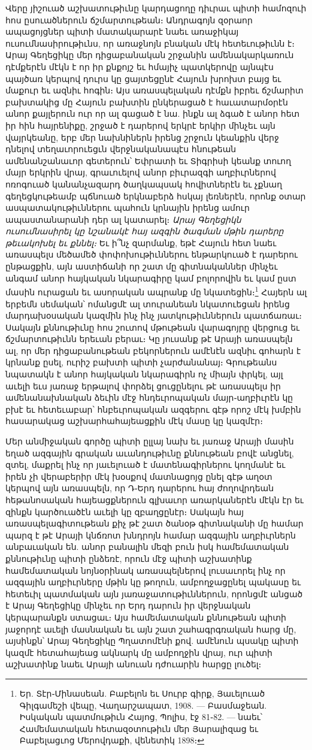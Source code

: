 \documentclass{article}
\begin{document}
{Վերը յիշուած աշխատութիւնը կարդացողը դիւրաւ պիտի համոզուի հոս ըսուածներուն ճշմարտութեան։ Անդրագոյն զօրաոր ապացոյցներ պիտի մատակարարէ նաեւ առաջիկայ ուսումնասիրութիւնս, որ առաջնոյն բնական մէկ հետեւութիւնն է։ Արայ Գեղեցիկը մեր դիցաբանական շրջանին ամենակարկառուն դէմքերէն մէկն է որ իր քնքոյշ եւ հմայիչ պատկերովը այնպէս պայծառ կերպով դուրս կը ցայտեցընէ Հայուն խրոխտ բայց եւ մաքուր եւ ազնիւ հոգին։ Այս առասպելական դէմքն իբրեւ ճշմարիտ բախտակից մը Հայուն բախտին ընկերացած է հաւատարմօրէն անոր քայլերուն ուր որ ալ գացած է նա. ինքն ալ ձգած է անոր հետ իր հին հայրենիքը, շրջած է դարերով երկրէ երկիր մինչեւ այն վայրկեանը, երբ մեր նախնիներն իրենց շրջուն կեանքին վերջ դնելով տեղաւորուեցւն վերջնականապէս հնութեան ամենանշանաւոր գետերուն՝ Եփրատի եւ Տիգրիսի կեանք տուող մայր երկրին վրայ, գրաւուելով անոր բիւրազգի աղբիւրներով ոռոգուած կանանչազարդ ծաղկապսակ հովիտներէն եւ չքնաղ գեղեցկութեամբ պճնուած երկնաբերձ հսկայ լեռներէն, որոնք օտար ասպատակութիւններու պահուն կրնային իրենց ամուր ապաստանարանի դեր ալ կատարել։ \emph{Արայ Գեղեցիկն ուսումնասիրել կը նշանակէ հայ ազգին ծագման մթին դարերը թեւակոխել եւ քննել։} Եւ ի՞նչ զարմանք, եթէ Հայուն հետ նաեւ առասպելս մեծամեծ փոփոխութիւններու ենթարկուած է դարերու ընթացքին, այն աստիճանի որ շատ մը գիտնականներ մինչեւ անգամ անոր հայկական նկարագիրը կամ բոլորովին եւ կամ ըստ մասին ուրացան եւ ասորական ապրանք մը նկատեցին։\footnote{Եր. Տէր֊Մինասեան. Բաբելոն եւ Սուրբ գիրք, Յաւելուած Գիլգամեշի վեպը, Վաղարշապատ, 1908. — Բասմաջեան. Իսկական պատմութիւն Հայոց, Պոլիս, էջ 81֊82. — նաեւ՝ Համեմատական հետազօտութիւն մեր Յարալիզաց եւ Բաբելացւոց Մերովդաքի, վենետիկ 1898։} Հայերն ալ երբեմն սեմական՝ ոմանցմէ ալ տուրանեան նկատուեցան իրենց մարդախօսական կազմին ինչ ինչ յատկութիւններուն պատճառաւ։ Սակայն քննութիւնը հոս շուտով մթութեան վարագոյրը վերցուց եւ ճշմարտութիւնն երեւան բերաւ։ Կը յուսանք թէ Արայի առասպելն ալ, որ մեր դիցաբանութեան բեկորներուն ամէնէն ազնիւ գոհարն է կրնանք ըսել, ուրիշ բախտի պիտի չարժանանայ։ Գրութեանս նպատակն է անոր հայկական նկարագիրն ոչ միայն փրկել, այլ աւելի եւս յառաջ երթալով փորձել ցուցընելու թէ առասպելս իր ամենանախնական ձեւին մէջ հնդեւրոպական մայր֊աղբիւրէն կը բխէ եւ հետեւաբար՝ հնբեւրոպական ազգերու գէթ որոշ մէկ խմբին հասարակաց աշխարհահայեացքին մէկ մասը կը կազմէր։

Մեր անմիջական գործը պիտի ըլլայ նախ եւ յառաջ Արայի մասին եղած ազգային գրական աւանդութիւնը քննութեան բովէ անցնել, զտել, մաքրել ինչ որ յաւելուած է մատենագիրներու կողմանէ եւ իրեն չի վերաբերիր մէկ խօսքով մատնացոյց ընել գէթ աղօտ կերպով այն առասպելն, որ Դ֊Երդ դարերու հայ ժողովրդեան հեթանոսական հայեացքներուն գլխաւոր առարկաներէն մէկն էր եւ զինքն կարծուածէն աւելի կը զբաղցընէր։ Սակայն հայ առասպելագիտութեան քիչ թէ շատ ծանօթ գիտնականի մը համար պարզ է թէ Արայի կնճռոտ խնդրոյն համար ազգային աղբիւրներն անբաւական են. անոր բանալին մեզի բուն իսկ համեմատական քննութիւնը պիտի ընձեռէ, որուն մէջ պիտի աշխատինք համեմատական նոյնօրինակ առասպելներով լուսաւորել ինչ որ ազգային աղբիւրները մթին կը թողուն, ամբողջացընել պակասը եւ հետեւիլ պատմական այն յառաջատութիւններուն, որոնցմէ անցած է Արայ Գեղեցիկը մինչեւ որ Երդ դարուն իր վերջնական կերպարանքն ստացաւ։ Այս համեմատական քննութեան պիտի յաջորդէ աւելի մասնական եւ այն շատ շահագրգռական հարց մը, այսինքն՝ Արայ Գեղեցիկը Պղատոմէնի քով. ամէնուն պսակը պիտի կազմէ հետահայեաց ակնարկ մը ամբողջին վրայ, ուր պիտի աշխատինք նաեւ Արայի անուան դժուարին հարցը լուծել։}
\clearpage
\end{document}

